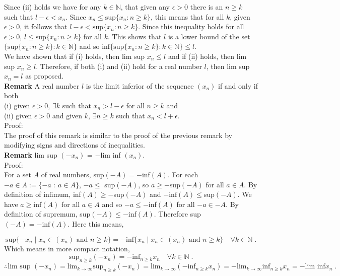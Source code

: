 \documentclass[a4paper]{article}
\begin{document}
Since (ii) holds we have for any $k \in \mathbb{N}$, that given any $\epsilon >0$ there is an $n\geq k$ such that $l-\epsilon < x_n$. Since $x_n \leq \text{sup} \{x_n : n \geq k\}$, this means that for all $k$, given $\epsilon>0$, it follows that $l-\epsilon < \text{sup} \{x_n : n \geq k\}$. Since this inequality holds for all $\epsilon >0$, $l \leq \text{sup} \{x_n : n \geq k\}$ for all $k$. This shows that $l$ is a lower bound of the set $\{\text{sup} \{x_n : n \geq k\} : k \in \mathbb{N}\}$ and so $\text{inf}\{\text{sup} \{x_n : n \geq k\} : k \in \mathbb{N}\} \leq l$.\\

We have shown that if (i) holds, then lim sup $x_n \leq l$ and if (ii) holds, then lim sup $x_n \geq l$. Therefore, if both (i) and (ii) hold for a real number $l$, then lim sup $x_n = l$ as proposed. \\

{\bf Remark} A real number $l$ is the limit inferior of the sequence $(x_n)$ if and only if both\\
(i) given $\epsilon >0$, $\exists k$ such that $x_n > l-\epsilon$ for all $n \geq k$ and \\
(ii) given $\epsilon >0$ and given $k$, $\exists n \geq k$ such that $x_n < l + \epsilon$.\\

Proof:\\
The proof of this remark is similar to the proof of the previous remark by modifying signs and directions of inequalities.\\

{\bf Remark} lim sup $(-x_n)$ = $-$lim inf $(x_n)$.\\

Proof:\\

For a set $A$ of real numbers, sup$(-A) = -$inf$(A)$. For each $-a \in A :=\{-a \; : \: a \in A\}$, $-a\leq$ sup$(-A)$, so $a \geq -$sup$(-A)$ for all $a \in A$. By definition of infimum, inf$(A) \geq -$sup$(-A)$ and $-\text{inf}(A) \leq $sup$(-A)$.  We have $a \geq $inf$(A)$ for all $a \in A$ and so $-a \leq -$inf$(A)$ for all $-a \in -A$. By definition of supremum, sup$(-A) \leq -$inf$(A)$. Therefore sup$(-A) = -\text{inf}(A)$. Here this means,

$$\text{sup}\{-x_n \; | \; x_n \in (x_n) \text { and } n\geq k\} = -\text{inf}\{x_n \; | \; x_n \in (x_n) \text { and } n\geq k\} \quad \forall k \in \mathbb{N} \;.$$
Which means in more compact notation,
$$\text{sup}_{n\geq k} (-x_n) = -\text{inf}_{n\geq k} x_n \quad \forall k \in \mathbb{N} \;.$$
$$\therefore \text{lim sup } (-x_n) = \text{lim}_{k\rightarrow \infty} \text{sup}_{n\geq k} (-x_n) = \text{lim}_{k\rightarrow \infty}(- \text{inf}_{n\geq k} x_n) = -\text{lim}_{k\rightarrow \infty}\text{inf}_{n\geq k} x_n = -\text{lim inf} x_n \;.$$
\end{document}
